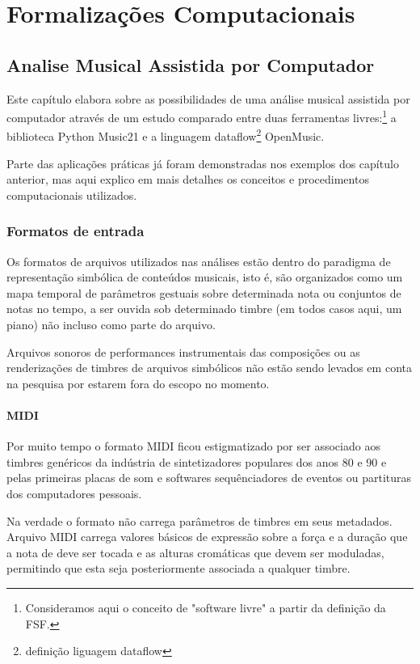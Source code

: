 \documentclass[
	12pt,				%
	openright,			%
	twoside,			%
	a4paper,			%
	english,			%
	french,				%
	spanish,			%
	brazil				%
	]{abntex2}
\begin{document}
\part{Formalizações Computacionais}


\chapter{Analise Musical Assistida por Computador}
\label{analise_computacional}

Este capítulo elabora sobre as possibilidades de uma análise musical assistida por computador através de um estudo comparado entre duas ferramentas livres:\footnote{Consideramos aqui o conceito de "software livre" a partir da definição da FSF.} a biblioteca Python Music21 e a linguagem dataflow\footnote{definição liguagem dataflow} OpenMusic.

Parte das aplicações práticas já foram demonstradas nos exemplos dos capítulo anterior, mas aqui explico em mais detalhes os conceitos e procedimentos computacionais utilizados.


\section{Formatos de entrada}


Os formatos de arquivos utilizados nas análises estão dentro do paradigma de representação simbólica de conteúdos musicais, isto é, são organizados como um mapa temporal de parâmetros gestuais sobre determinada nota ou conjuntos de notas no tempo, a ser ouvida sob determinado timbre (em todos casos aqui, um piano) não incluso como parte do arquivo. 

Arquivos sonoros de performances instrumentais das composições ou as renderizações de timbres de arquivos simbólicos não estão sendo levados em conta na pesquisa por estarem fora do escopo no momento.



\subsection{MIDI}

Por muito tempo o formato MIDI ficou estigmatizado por ser associado aos timbres genéricos da indústria de sintetizadores populares dos anos 80 e 90 e pelas primeiras placas de som e softwares sequênciadores de eventos ou partituras dos computadores pessoais. 

Na verdade o formato não carrega parâmetros de timbres em seus metadados. Arquivo MIDI carrega valores básicos de expressão sobre a força e a duração que a nota de deve ser tocada e as alturas cromáticas que devem ser moduladas, permitindo que esta seja posteriormente associada a qualquer timbre.
\end{document}
